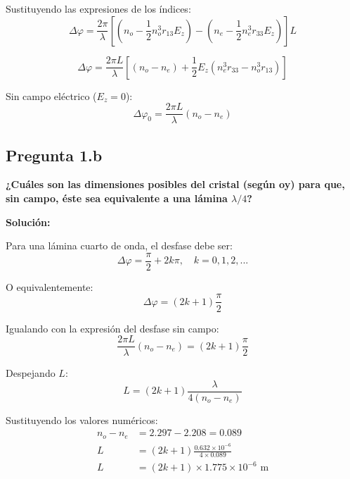 \documentclass[12pt,a4paper]{article}
\begin{document}
Sustituyendo las expresiones de los índices:
\begin{equation}
\Delta\varphi = \frac{2\pi}{\lambda} \left[ \left(n_o - \frac{1}{2}n_o^3 r_{13} E_z\right) - \left(n_e - \frac{1}{2}n_e^3 r_{33} E_z\right) \right] L
\end{equation}

\begin{equation}
\boxed{\Delta\varphi = \frac{2\pi L}{\lambda} \left[ (n_o - n_e) + \frac{1}{2}E_z(n_e^3 r_{33} - n_o^3 r_{13}) \right]}
\end{equation}

Sin campo eléctrico ($E_z = 0$):
\begin{equation}
\Delta\varphi_0 = \frac{2\pi L}{\lambda}(n_o - n_e)
\end{equation}

\subsection*{Pregunta 1.b}
\textbf{¿Cuáles son las dimensiones posibles del cristal (según oy) para que, sin campo, éste sea equivalente a una lámina $\lambda/4$?}

\vspace{0.3cm}
\textbf{Solución:}

Para una lámina cuarto de onda, el desfase debe ser:
\begin{equation}
\Delta\varphi = \frac{\pi}{2} + 2k\pi, \quad k = 0, 1, 2, ...
\end{equation}

O equivalentemente:
\begin{equation}
\Delta\varphi = (2k+1)\frac{\pi}{2}
\end{equation}

Igualando con la expresión del desfase sin campo:
\begin{equation}
\frac{2\pi L}{\lambda}(n_o - n_e) = (2k+1)\frac{\pi}{2}
\end{equation}

Despejando $L$:
\begin{equation}
L = (2k+1)\frac{\lambda}{4(n_o - n_e)}
\end{equation}

Sustituyendo los valores numéricos:
\begin{align}
n_o - n_e &= 2.297 - 2.208 = 0.089 \\
L &= (2k+1)\frac{0.632 \times 10^{-6}}{4 \times 0.089} \\
L &= (2k+1) \times 1.775 \times 10^{-6} \text{ m}
\end{align}
\end{document}
